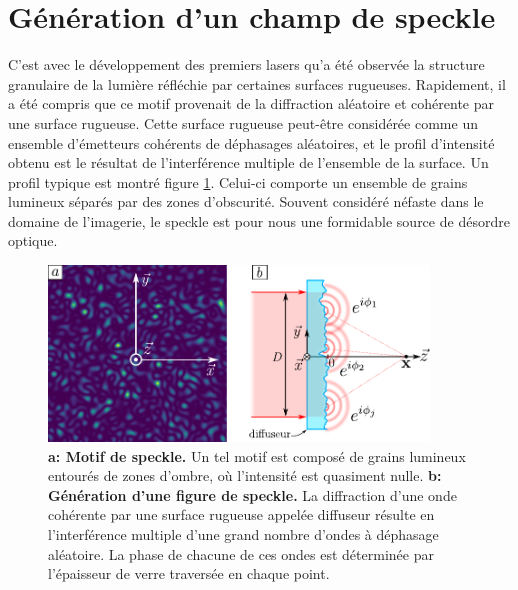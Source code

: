 \section{Génération d'un champ de speckle}
C'est avec le développement des premiers lasers qu'a été observée la structure granulaire de la lumière réfléchie par certaines surfaces rugueuses. Rapidement, il a été compris que ce motif provenait de la diffraction aléatoire et cohérente par une surface rugueuse. 
Cette surface rugueuse peut-être considérée comme un ensemble d'émetteurs cohérents de déphasages aléatoires, et le profil d'intensité obtenu est le résultat de l'interférence multiple de l'ensemble de la surface. Un profil typique est montré figure \ref{fig:speckle_pattern}. Celui-ci comporte un ensemble de grains lumineux séparés par des zones d'obscurité.
Souvent considéré néfaste dans le domaine de l'imagerie, le speckle est pour nous une formidable source de désordre optique. 

\begin{figure}
\centering
\includegraphics[width=0.9\textwidth]{Fig/Speckle/speckle_pattern.pdf}
\caption{\textbf{a: Motif de speckle.} Un tel motif est composé de grains lumineux entourés de zones d'ombre, où l'intensité est quasiment nulle. \textbf{b: Génération d'une figure de speckle.} La diffraction d'une onde cohérente par une surface rugueuse appelée diffuseur résulte en l'interférence multiple d'une grand nombre d'ondes à déphasage aléatoire. La phase de chacune de ces ondes est déterminée par l'épaisseur de verre traversée en chaque point.}
\label{fig:speckle_pattern}
\end{figure}



